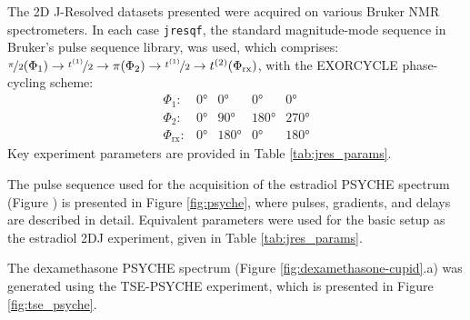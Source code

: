The 2D J-Resolved datasets presented were acquired on various Bruker NMR
spectrometers. In each case \texttt{jresqf}, the standard magnitude-mode
sequence in Bruker's pulse sequence library, was used, which comprises:
 $\nicefrac{\pi}{2}(\Phi_1) \rightarrow \nicefrac{t^{(1)}}{2} \rightarrow
\pi(\Phi_{2}) \rightarrow \nicefrac{t^{(1)}}{2} \rightarrow t^{(2)}(\Phi_{\text{rx}})$, with
the EXORCYCLE phase-cycling scheme\cite[Section 11.6]{Keeler2010}:
\begin{equation*}
    \begin{array}{lllll}
        \Phi_{1}: & \ang{0} & \ang{0} & \ang{0} & \ang{0} \\
        \Phi_{2}: & \ang{0} & \ang{90} & \ang{180} & \ang{270} \\
        \Phi_{\text{rx}}: & \ang{0} & \ang{180} & \ang{0} & \ang{180}
    \end{array}
\end{equation*}
Key experiment parameters are provided in Table \ref{tab:jres_params}.

The pulse sequence used for the acquisition of the estradiol \ac{PSYCHE}
spectrum (Figure ) is presented in Figure \ref{fig:psyche}, where
pulses, gradients, and delays are described in detail. Equivalent parameters
were used for the basic setup as the estradiol 2DJ experiment, given in Table
\ref{tab:jres_params}.

The dexamethasone \ac{PSYCHE} spectrum (Figure \ref{fig:dexamethasone-cupid}.a)
was generated using the \ac{TSE-PSYCHE} experiment, which is presented in
Figure \ref{fig:tse_psyche}.



